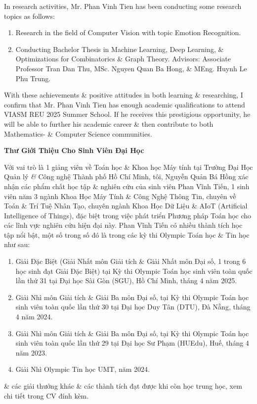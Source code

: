 \documentclass[11pt]{article}
\begin{document}
In research activities, Mr. {\sc Phan Vinh Tien} has been conducting some research topics as follows:
\begin{enumerate}
    \item Research in the field of Computer Vision with topic Emotion Recognition.
    
    \item Conducting Bachelor Thesis in Machine Learning, Deep Learning, \& Optimizations for Combinatorics \& Graph Theory. Advisors: Associate Professor {\sc Tran Dan Thu}, MSc. {\sc Nguyen Quan Ba Hong}, \& MEng. {\sc Huynh Le Phu Trung}.
\end{enumerate}
With these achievements \& positive attitudes in both learning \& researching, I confirm that Mr. {\sc Phan Vinh Tien} has enough academic qualifications to attend VIASM REU 2025 Summer School. If he receives this prestigious opportunity, he will be able to further his academic career \& then contribute to both Mathematics- \& Computer Science communities.

\begin{center}
    \LARGE
    \textbf{\textsf{Thư Giới Thiệu Cho Sinh Viên Đại Học}}
\end{center}
Với vai trò là 1 giảng viên về Toán học \& Khoa học Máy tính tại Trường Đại Học Quản lý {\it\&} Công nghệ Thành phố Hồ Chí Minh, tôi, {\sc Nguyễn Quản Bá Hồng} xác nhận các phẩm chất học tập \& nghiên cứu của sinh viên {\sc Phan Vĩnh Tiến}, 1 sinh viên năm 3 ngành Khoa Học Máy Tính \& Công Nghệ Thông Tin, chuyên về Toán \& Trí Tuệ Nhân Tạo, chuyên ngành Khoa Học Dữ Liệu \& AIoT (Artificial Intelligence of Things), đặc biệt trong việc phát triển Phương pháp Toán học cho các lĩnh vực nghiên cứu hiện đại này. {\sc Phan Vĩnh Tiến} có nhiều thành tích học tập nổi bật, một số trong số đó là trong các kỳ thi Olympic Toán học \& Tin học như sau:
\begin{enumerate}
    \item Giải Đặc Biệt (Giải Nhất môn Giải tích \& Giải Nhất môn Đại số, 1 trong 6 học sinh đạt Giải Đặc Biệt) tại Kỳ thi Olympic Toán học sinh viên toàn quốc lần thứ 31 tại Đại học Sài Gòn (SGU), Hồ Chí Minh, tháng 4 năm 2025.
    
    \item Giải Nhì môn Giải tích \& Giải Ba môn Đại số, tại Kỳ thi Olympic Toán học sinh viên toàn quốc lần thứ 30 tại Đại học Duy Tân (DTU), Đà Nẵng, tháng 4 năm 2024.
    
    \item Giải Nhì môn Giải tích \& Giải Ba môn Đại số, tại Kỳ thi Olympic Toán học sinh viên toàn quốc lần thứ 29 tại Đại học Sư Phạm (HUEdu), Huế, tháng 4 năm 2023.
    
    \item Giải Nhì Olympic Tin học UMT, năm 2024.
\end{enumerate}
\& các giải thưởng khác \& các thành tích đạt được khi còn học trung học, xem chi tiết trong CV đính kèm.
\end{document}
